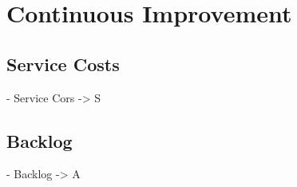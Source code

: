 \chapter{Continuous Improvement}
\label{cap:continuousimprovement}


\section{Service Costs}
- Service Cors -> S

\section{Backlog}
- Backlog -> A